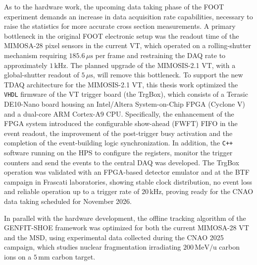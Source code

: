 As to the hardware work, the upcoming data taking phase of the FOOT experiment demands an increase in data acquisition rate capabilities, necessary to raise the statistics for more accurate cross section measurements. A primary bottleneck in the original FOOT electronic setup was the readout time of the MIMOSA-28 pixel sensors in the current VT, which operated on a rolling-shutter mechanism requiring $185.6\,\mu\mathrm{s}$ per frame and restraining the DAQ rate to approximately $1\,\mathrm{kHz}$. The planned upgrade of the MIMOSIS-2.1 VT, with a global-shutter readout of $5\,\mu\mathrm{s}$, will remove this bottleneck. To support the new TDAQ architecture for the MIMOSIS-2.1 VT, this thesis work optimized the \texttt{VHDL} firmware of the VT trigger board (the TrgBox), which consists of a Terasic DE10-Nano board housing an Intel/Altera System-on-Chip FPGA (Cyclone V) and a dual-core ARM Cortex-A9 CPU. Specifically, the enhancement of the FPGA system introduced the configurable show-ahead (FWFT) FIFO in the event readout, the improvement of the post-trigger busy activation and the completion of the event-building logic synchronization. In addition, the \texttt{C++} software running on the HPS to configure the registers, monitor the trigger counters and send the events to the central DAQ was developed. The TrgBox operation was validated with an FPGA-based detector emulator and at the BTF campaign in Frascati laboratories, showing stable clock distribution, no event loss and reliable operation up to a trigger rate of $20\,\mathrm{kHz}$, proving ready for the CNAO data taking scheduled for November 2026.

In parallel with the hardware development, the offline tracking algorithm of the GENFIT-SHOE framework was optimized for both the current MIMOSA-28 VT and the MSD, using experimental data collected during the CNAO 2025 campaign, which studies nuclear fragmentation irradiating $200\,\mathrm{MeV/u}$ carbon ions on a $5\,\mathrm{mm}$ carbon target.


